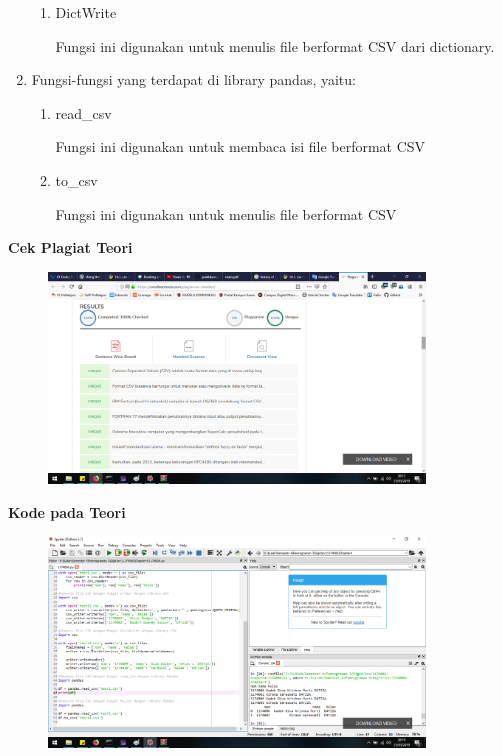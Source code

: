 \begin{enumerate}
\begin{enumerate}
		\item DictWrite
		
		Fungsi ini digunakan untuk menulis file berformat CSV dari dictionary.
		
		
		
	\end{enumerate}
	
	\item Fungsi-fungsi yang terdapat di library pandas, yaitu:
	\begin{enumerate}
		\item read\_csv
		
		Fungsi ini digunakan untuk membaca isi file berformat CSV
		
		
		
		\item to\_csv
		
		Fungsi ini digunakan untuk menulis file berformat CSV
		
		
		
	\end{enumerate}
\end{enumerate}

\textbf{Cek Plagiat Teori}

\begin{figure}[H]
	\includegraphics[width=10cm]{figures/diva/Chapter4/plagiat_teori.png}
	\centering
\end{figure}

\textbf{Kode pada Teori}

\begin{figure}[H]
	\includegraphics[width=10cm]{figures/diva/Chapter4/kode_teori1.png}
	\centering
\end{figure}

